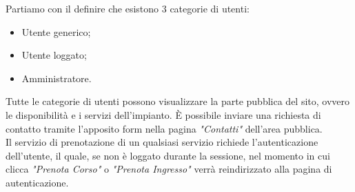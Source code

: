 Partiamo con il definire che esistono 3 categorie di utenti:
\begin{itemize}
    \item Utente generico;
    \item Utente loggato;
    \item Amministratore.
\end{itemize}

Tutte le categorie di utenti possono visualizzare la parte pubblica del sito, ovvero le disponibilità e i servizi dell'impianto. È possibile inviare una richiesta di contatto tramite l'apposito form nella pagina \textit{"Contatti"} dell'area pubblica.\\

Il servizio di prenotazione di un qualsiasi servizio richiede l'autenticazione dell'utente, il quale, se non è loggato durante la sessione, nel momento in cui clicca \textit{"Prenota Corso"} o \textit{"Prenota Ingresso"} verrà reindirizzato alla pagina
di autenticazione.